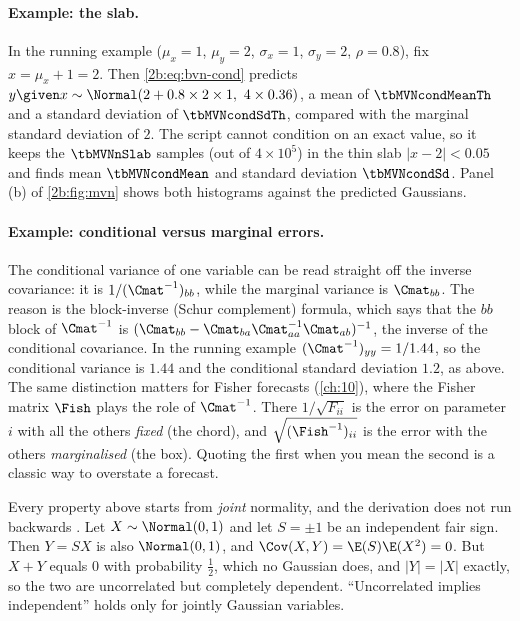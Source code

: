 \paragraph{Example: the slab.} In the running example ($\mu_x=1$, $\mu_y=2$, $\sigma_x=1$, $\sigma_y=2$, $\rho=0.8$), fix $x=\mu_x+1=2$. Then \eqref{2b:eq:bvn-cond} predicts $y\given x\sim\Normal(2+0.8\times2\times1,\ 4\times0.36)$, a mean of $\tbMVNcondMeanTh$ and a standard deviation of $\tbMVNcondSdTh$, compared with the marginal standard deviation of $2$. The script cannot condition on an exact value, so it keeps the $\tbMVNnSlab$ samples (out of $4\times10^5$) in the thin slab $|x-2|<0.05$ and finds mean $\tbMVNcondMean$ and standard deviation $\tbMVNcondSd$. Panel (b) of \cref{2b:fig:mvn} shows both histograms against the predicted Gaussians.

\paragraph{Example: conditional versus marginal errors.} The conditional variance of one variable can be read straight off the inverse covariance: it is $1/(\Cmat^{-1})_{bb}$, while the marginal variance is $\Cmat_{bb}$. The reason is the block-inverse (Schur complement) formula, which says that the $bb$ block of $\Cmat^{-1}$ is $(\Cmat_{bb}-\Cmat_{ba}\Cmat_{aa}^{-1}\Cmat_{ab})^{-1}$, the inverse of the conditional covariance. In the running example $(\Cmat^{-1})_{yy}=1/1.44$, so the conditional variance is $1.44$ and the conditional standard deviation $1.2$, as above. The same distinction matters for Fisher forecasts (\cref{ch:10}), where the Fisher matrix $\Fish$ plays the role of $\Cmat^{-1}$. There $1/\sqrt{F_{ii}}$ is the error on parameter $i$ with all the others \emph{fixed} (the chord), and $\sqrt{(\Fish^{-1})_{ii}}$ is the error with the others \emph{marginalised} (the box). Quoting the first when you mean the second is a classic way to overstate a forecast.

\begin{pitfall}
Every property above starts from \emph{joint} normality, and the derivation does not run backwards . Let $X\sim\Normal(0,1)$ and let $S=\pm1$ be an independent fair sign. Then $Y=SX$ is also $\Normal(0,1)$, and $\Cov(X,Y)=\E(S)\E(X^2)=0$. But $X+Y$ equals $0$ with probability $\frac12$, which no Gaussian does, and $|Y|=|X|$ exactly, so the two are uncorrelated but completely dependent. ``Uncorrelated implies independent'' holds only for jointly Gaussian variables.
\end{pitfall}

